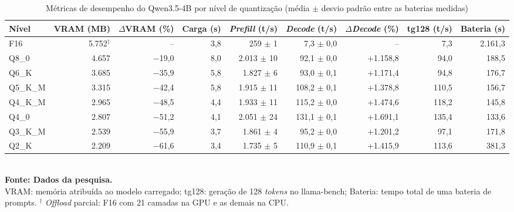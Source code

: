 \begin{table}[htb]
\centering
\caption{Métricas de desempenho do Qwen3.5-4B por nível de quantização (média $\pm$ desvio padrão entre as baterias medidas)}
\label{tab:desempenho-Qwen3.5-4B}
\small
\begin{tabular}{lrrrrrrrr}
\hline
\textbf{Nível} & \textbf{VRAM (MB)} & \textbf{$\Delta$VRAM (\%)} & \textbf{Carga (s)} & \textbf{\textit{Prefill} (t/s)} & \textbf{\textit{Decode} (t/s)} & \textbf{$\Delta$\textit{Decode} (\%)} & \textbf{tg128 (t/s)} & \textbf{Bateria (s)} \\
\hline
F16 & 5.752$^\dagger$ & -- & 3,8 & 259 $\pm$ 1 & 7,3 $\pm$ 0,0 & -- & 7,3 & 2.161,3 \\
Q8\_0 & 4.657 & $-$19,0 & 8,0 & 2.013 $\pm$ 10 & 92,1 $\pm$ 0,0 & +1.158,8 & 94,0 & 188,5 \\
Q6\_K & 3.685 & $-$35,9 & 5,8 & 1.827 $\pm$ 6 & 93,0 $\pm$ 0,1 & +1.171,4 & 94,8 & 176,7 \\
Q5\_K\_M & 3.315 & $-$42,4 & 5,8 & 1.915 $\pm$ 11 & 108,2 $\pm$ 0,1 & +1.378,8 & 110,5 & 156,7 \\
Q4\_K\_M & 2.965 & $-$48,5 & 4,4 & 1.933 $\pm$ 11 & 115,2 $\pm$ 0,0 & +1.474,6 & 118,2 & 145,8 \\
Q4\_0 & 2.807 & $-$51,2 & 4,1 & 2.051 $\pm$ 24 & 131,1 $\pm$ 0,1 & +1.691,1 & 135,4 & 133,6 \\
Q3\_K\_M & 2.539 & $-$55,9 & 3,7 & 1.861 $\pm$ 4 & 95,2 $\pm$ 0,0 & +1.201,2 & 97,1 & 171,8 \\
Q2\_K & 2.209 & $-$61,6 & 3,4 & 1.735 $\pm$ 5 & 110,9 $\pm$ 0,1 & +1.415,9 & 113,6 & 381,3 \\
\hline
\end{tabular}
\\[2pt]{\footnotesize \textbf{Fonte: Dados da pesquisa.}}
\\[2pt]{\footnotesize VRAM: memória atribuída ao modelo carregado; tg128: geração de 128 \textit{tokens} no llama-bench; Bateria: tempo total de uma bateria de prompts. $^\dagger$ \textit{Offload} parcial: F16 com 21 camadas na GPU e as demais na CPU.}
\end{table}
